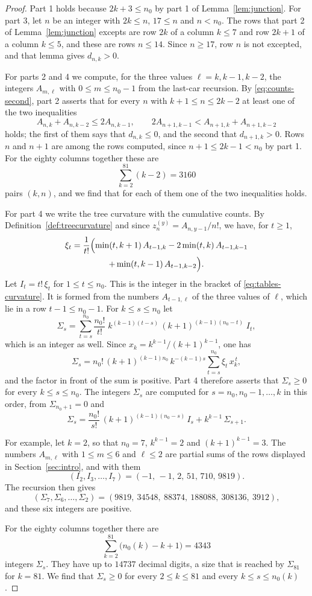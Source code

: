 \documentclass{amsart}
\theoremstyle{definition}
\theoremstyle{remark}
\numberwithin{equation}{section}
\begin{document}
\begin{proof}
Part 1 holds because $2k+3\le n_0$ by part 1 of Lemma~\ref{lem:junction}.
For part 3, let $n$ be an
integer with $2k\le n$, $17\le n$ and $n<n_0$. The rows that part 2 of
Lemma~\ref{lem:junction} excepts are row $2k$ of a column $k\le7$ and row
$2k+1$ of a column $k\le5$, and these are rows $n\le14$. Since $n\ge17$,
row $n$ is not excepted, and that lemma gives $d_{n,k}>0$.

For parts 2 and 4 we compute, for the three values $\ell=k,k-1,k-2$, the
integers $A_{m,\ell}$ with $0\le m\le n_0-1$ from the last-car recursion.
By \eqref{eq:counts-second}, part 2 asserts that for every $n$ with
$k+1\le n\le2k-2$ at least one of the two inequalities
\[
A_{n,k}+A_{n,k-2}\le2A_{n,k-1},\qquad
2A_{n+1,k-1}<A_{n+1,k}+A_{n+1,k-2}
\]
holds; the first of them says that $d_{n,k}\le0$, and the second that
$d_{n+1,k}>0$. Rows $n$ and $n+1$ are among the rows computed, since
$n+1\le2k-1<n_0$ by part 1. For the eighty columns together these are
\[
\sum_{k=2}^{81}(k-2)=3160
\]
pairs $(k,n)$, and we find that for each of them one of the two
inequalities holds.

For part 4 we write the tree curvature with the cumulative counts. By
Definition~\ref{def:treecurvature} and since $z^{(y)}_n=A_{n,y-1}/n!$, we
have, for $t\ge1$,
\begin{multline}\label{eq:tables-curvature}
\xi_t=\frac1{t!}\Bigl(\min(t,k+1)\,A_{t-1,k}-2\min(t,k)\,A_{t-1,k-1}\\
+\min(t,k-1)\,A_{t-1,k-2}\Bigr).
\end{multline}
Let $I_t=t!\,\xi_t$ for $1\le t\le n_0$. This is the integer
in the bracket of \eqref{eq:tables-curvature}. It is formed
from the numbers $A_{t-1,\ell}$ of the three values of $\ell$, which lie in
a row $t-1\le n_0-1$. For $k\le s\le n_0$ let
\[
\Sigma_s=\sum_{t=s}^{n_0}\frac{n_0!}{t!}\;k^{(k-1)(t-s)}\,
(k+1)^{(k-1)(n_0-t)}\;I_t ,
\]
which is an integer as well. Since $x_k=k^{k-1}/(k+1)^{k-1}$, one has
\[
\Sigma_s=n_0!\,(k+1)^{(k-1)n_0}\,k^{-(k-1)s}\sum_{t=s}^{n_0}\xi_t\,x_k^{\,t},
\]
and the factor in front of the sum is positive. Part 4 therefore asserts
that $\Sigma_s\ge0$ for every $k\le s\le n_0$. The integers $\Sigma_s$ are
computed for $s=n_0,n_0-1,\dots,k$ in this order, from $\Sigma_{n_0+1}=0$
and
\[
\Sigma_s=\frac{n_0!}{s!}\,(k+1)^{(k-1)(n_0-s)}\,I_s+k^{k-1}\,\Sigma_{s+1}.
\]

For example, let $k=2$, so that $n_0=7$, $k^{k-1}=2$ and $(k+1)^{k-1}=3$.
The numbers $A_{m,\ell}$ with $1\le m\le6$ and $\ell\le2$ are partial sums
of the rows displayed in Section~\ref{sec:intro}, and with them
\[
(I_2,I_3,\dots,I_7)=(-1,\,-1,\,2,\,51,\,710,\,9819).
\]
The recursion then gives
\[
(\Sigma_7,\Sigma_6,\dots,\Sigma_2)
=(9819,\ 34548,\ 88374,\ 188088,\ 308136,\ 3912),
\]
and these six integers are positive.

For the eighty columns together there are
\[
\sum_{k=2}^{81}\bigl(n_0(k)-k+1\bigr)=4343
\]
integers $\Sigma_s$. They have up to $14737$ decimal digits, a size that is
reached by $\Sigma_{81}$ for $k=81$. We find that $\Sigma_s\ge0$ for every
$2\le k\le81$ and every $k\le s\le n_0(k)$.
\end{proof}
\end{document}
